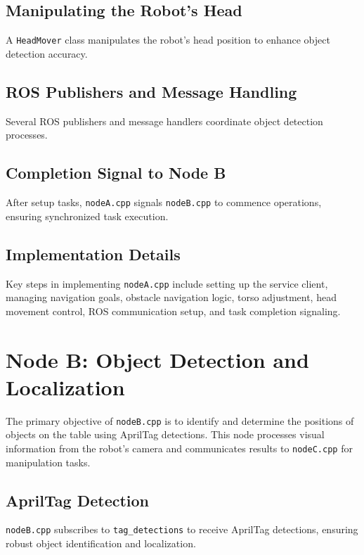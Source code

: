 \documentclass[a4paper]{article}
\begin{document}
\subsection{Manipulating the Robot's Head}

A \texttt{HeadMover} class manipulates the robot's head position to enhance object detection accuracy.

\subsection{ROS Publishers and Message Handling}

Several ROS publishers and message handlers coordinate object detection processes.

\subsection{Completion Signal to Node B}

After setup tasks, \texttt{nodeA.cpp} signals \texttt{nodeB.cpp} to commence operations, ensuring synchronized task execution.

\subsection{Implementation Details}

Key steps in implementing \texttt{nodeA.cpp} include setting up the service client, managing navigation goals, obstacle navigation logic, torso adjustment, head movement control, ROS communication setup, and task completion signaling.


\section{Node B: Object Detection and Localization}

The primary objective of \texttt{nodeB.cpp} is to identify and determine the positions of objects on the table using AprilTag detections. This node processes visual information from the robot's camera and communicates results to \texttt{nodeC.cpp} for manipulation tasks.

\subsection{AprilTag Detection}

\texttt{nodeB.cpp} subscribes to \texttt{tag\_detections} to receive AprilTag detections, ensuring robust object identification and localization.
\end{document}
